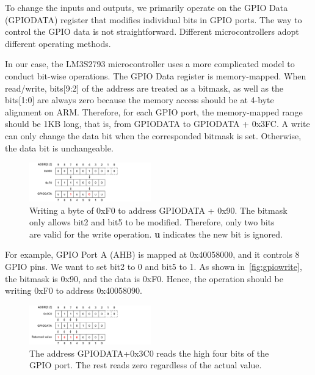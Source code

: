 To change the inputs and outputs, we primarily operate on the GPIO Data (GPIODATA) register that modifies individual bits in GPIO ports. The way to control the GPIO data is not straightforward.  Different microcontrollers adopt different operating methods. %

In our case, the LM3S2793 microcontroller uses a more complicated model to conduct bit-wise operations. The GPIO Data register is memory-mapped. When read/write, bits[9:2] of the address are treated as a bitmask, as well as the bits[1:0] are always zero because the memory access should be at 4-byte alignment on ARM. Therefore, for each GPIO port, the memory-mapped range should be 1KB long, that is, from GPIODATA to GPIODATA + 0x3FC. A write can only change the data bit when the corresponded bitmask is set. Otherwise, the data bit is unchangeable.


\begin{figure}[tp!]
	\includegraphics[width=0.47\textwidth]{figures/gpiowrite2}
	\centering
	\caption{Writing a byte of 0xF0 to address GPIODATA + 0x90.  The bitmask only allows bit2 and bit5 to be modified. Therefore, only two bits are valid for the write operation.  \textbf{u} indicates the new bit is ignored.}
	\label{fig:gpiowrite}
\end{figure}

For example, GPIO Port A (AHB) is mapped at 0x40058000, and it controls 8 GPIO pins. We want to set bit2 to 0 and bit5 to 1. As shown in~\autoref{fig:gpiowrite}, the bitmask is 0x90, and the data is 0xF0.  Hence, the operation should be writing 0xF0 to address 0x40058090.

\begin{figure}[tp!]
	\includegraphics[width=0.47\textwidth]{figures/gpioread2}
	\centering
	\caption{The address GPIODATA+0x3C0 reads the high four bits of the GPIO port. The rest reads zero regardless of the actual value.}
	\label{fig:gpioread}
\end{figure}


